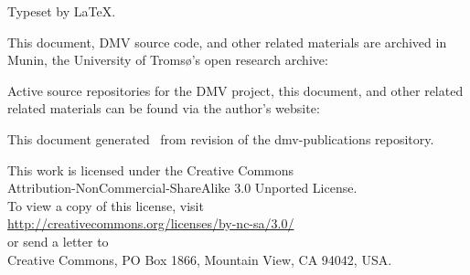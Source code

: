 
\clearpage
\vspace*{\fill}

Typeset by \LaTeX.

This document, \gls{DMV} source code, and other related materials are archived
in Munin, the University of Tromsø's open research archive: \\
\muninurl

Active source repositories for the \gls{DMV} project, this document, and other
related related materials can be found via the author's website: \\
\dmvurl

This document generated \GITAuthorDate\ from revision \GITAbrHash{} of the
dmv-publications repository.

This work is licensed under the Creative Commons \\
Attribution-NonCommercial-ShareAlike 3.0 Unported License. \\
To view a copy of this license, visit \\
\url{http://creativecommons.org/licenses/by-nc-sa/3.0/} \\
or send a letter to \\
Creative Commons, PO Box 1866, Mountain View, CA 94042, USA.
